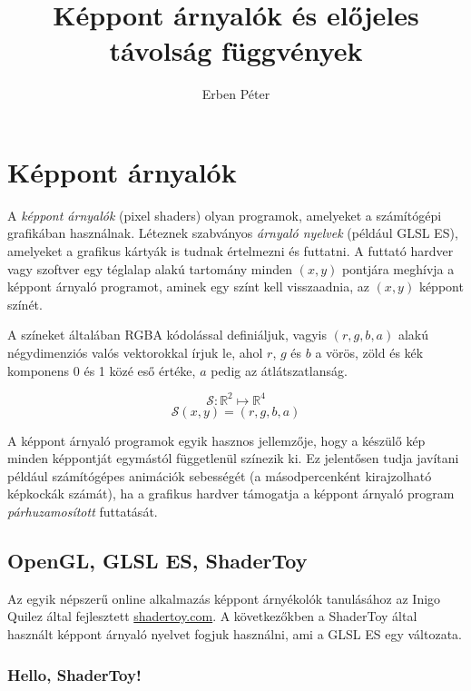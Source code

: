 

\title{Képpont árnyalók és előjeles távolság függvények}
\author{Erben Péter}


\maketitle

\section{Képpont árnyalók}

\begin{tcolorbox}[title=Képpont árnyalók]
A \emph{képpont árnyalók} (pixel shaders) olyan programok, amelyeket a számítógépi grafikában használnak.
Léteznek szabványos \emph{árnyaló nyelvek} (például GLSL ES), amelyeket a grafikus kártyák
is tudnak értelmezni és futtatni. A futtató hardver vagy szoftver egy téglalap alakú tartomány
minden $(x,y)$ pontjára meghívja a képpont árnyaló programot, aminek egy színt kell visszaadnia,
az $(x,y)$ képpont színét.

A színeket általában RGBA kódolással definiáljuk, vagyis $(r, g, b, a)$ alakú négydimenziós
valós vektorokkal írjuk le, ahol $r$, $g$ és $b$ a vörös, zöld és kék komponens 0 és 1 közé eső
értéke, $a$ pedig az átlátszatlanság.

$$\mathcal{S}: \mathbb{R}^2 \mapsto \mathbb{R}^4$$
$$\mathcal{S}(x, y) = (r, g, b, a)$$
\end{tcolorbox}

A képpont árnyaló programok egyik hasznos jellemzője, hogy a készülő kép minden képpontját
egymástól függetlenül színezik ki. Ez jelentősen tudja javítani például számítógépes animációk
sebességét (a másodpercenként kirajzolható képkockák számát), ha a grafikus hardver támogatja
a képpont árnyaló program \emph{párhuzamosított} futtatását.

\subsection{OpenGL, GLSL ES, ShaderToy}

Az egyik népszerű online alkalmazás képpont árnyékolók tanulásához az Inigo Quilez által fejlesztett
\url{shadertoy.com}. A következőkben a ShaderToy által használt képpont árnyaló nyelvet fogjuk használni,
ami a GLSL ES egy változata.

\subsubsection{Hello, ShaderToy!}

